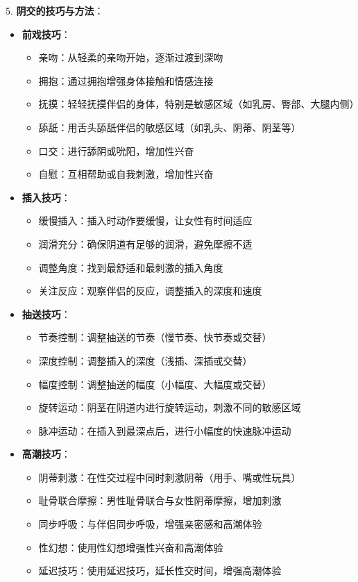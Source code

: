 \documentclass[12pt,UTF8]{ctexbook}
\begin{document}
5. \textbf{阴交的技巧与方法}：
\begin{itemize}
	\item \textbf{前戏技巧}：
	\begin{itemize}
		\item 亲吻：从轻柔的亲吻开始，逐渐过渡到深吻
		\item 拥抱：通过拥抱增强身体接触和情感连接
		\item 抚摸：轻轻抚摸伴侣的身体，特别是敏感区域（如乳房、臀部、大腿内侧）
		\item 舔舐：用舌头舔舐伴侣的敏感区域（如乳头、阴蒂、阴茎等）
		\item 口交：进行舔阴或吮阳，增加性兴奋
		\item 自慰：互相帮助或自我刺激，增加性兴奋
	\end{itemize}
	\item \textbf{插入技巧}：
	\begin{itemize}
		\item 缓慢插入：插入时动作要缓慢，让女性有时间适应
		\item 润滑充分：确保阴道有足够的润滑，避免摩擦不适
		\item 调整角度：找到最舒适和最刺激的插入角度
		\item 关注反应：观察伴侣的反应，调整插入的深度和速度
	\end{itemize}
	\item \textbf{抽送技巧}：
	\begin{itemize}
		\item 节奏控制：调整抽送的节奏（慢节奏、快节奏或交替）
		\item 深度控制：调整插入的深度（浅插、深插或交替）
		\item 幅度控制：调整抽送的幅度（小幅度、大幅度或交替）
		\item 旋转运动：阴茎在阴道内进行旋转运动，刺激不同的敏感区域
		\item 脉冲运动：在插入到最深点后，进行小幅度的快速脉冲运动
	\end{itemize}
	\item \textbf{高潮技巧}：
	\begin{itemize}
		\item 阴蒂刺激：在性交过程中同时刺激阴蒂（用手、嘴或性玩具）
		\item 耻骨联合摩擦：男性耻骨联合与女性阴蒂摩擦，增加刺激
		\item 同步呼吸：与伴侣同步呼吸，增强亲密感和高潮体验
		\item 性幻想：使用性幻想增强性兴奋和高潮体验
		\item 延迟技巧：使用延迟技巧，延长性交时间，增强高潮体验
	\end{itemize}
\end{itemize}
\end{document}
